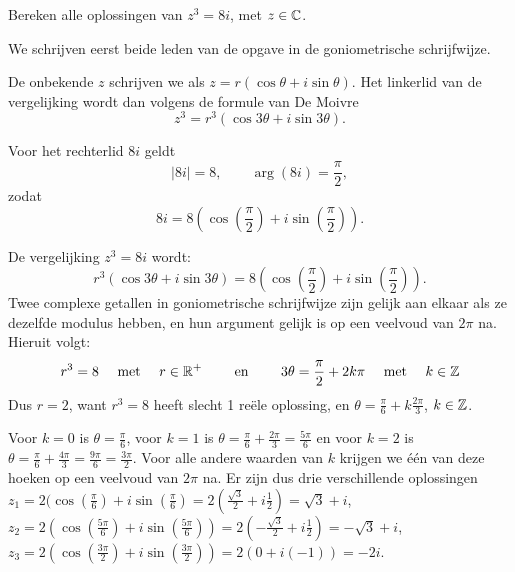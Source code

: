 \documentclass{ximera}
\begin{document}
\begin{basicSkip}
	\begin{exercise} Bereken alle oplossingen van $z^3=8i$, met $z\in \mathbb{C}$.
		\begin{oplossing}
			We schrijven eerst beide leden van de opgave in de goniometrische schrijfwijze.
			
			De onbekende $z$ schrijven we als $z = r(\cos\theta+i\sin\theta)$. Het linkerlid van de vergelijking wordt dan volgens de formule van De Moivre $$z^3 = r^3 (\cos 3\theta+i\sin 3\theta).$$
			
			Voor het rechterlid $8i$ geldt
			\[ |8i| = 8, \qquad \arg (8i) =  \frac{\pi}{2}, \]
			zodat
			\[ 8i = 8( \cos(\frac{\pi}{2}) + i \sin(\frac{\pi}{2})). \]
			
			De
			vergelijking $z^3=8i$ wordt:
			$$r^3 (\cos 3\theta+i\sin 3\theta) = 8( \cos(\frac{\pi}{2}) + i \sin(\frac{\pi}{2})).$$
			Twee complexe getallen in goniometrische schrijfwijze zijn gelijk aan elkaar als ze dezelfde modulus hebben, en hun argument gelijk is op een veelvoud van $2 \pi$ na.
			Hieruit volgt:
			\[ r^3 = 8 \quad \text{ met } \quad r\in \mathbb{R}^+ \qquad \text{ en } \qquad 3 \theta =  \frac{\pi}{2} + 2 k \pi \quad \text{ met } \quad k\in \mathbb{Z}\]
			Dus $r= 2$, want $r^3=8$ heeft slecht 1 reële oplossing, en $\theta =  \frac{\pi}{6} + k \frac{2\pi}{3}$, $k \in \mathbb{Z}$. 
			
			Voor $k=0$ is
			$\theta =  \frac{\pi}{6}$, voor $k=1$ is $\theta = 
			\frac{\pi}{6} + \frac{2\pi}{3} = \frac{5\pi}{6}$ en voor $k=2$ is $\theta = 
			\frac{\pi}{6} + \frac{4\pi}{3} = \frac{9\pi}{6} = \frac{3\pi}{2}$. Voor alle andere waarden van $k$ krijgen we één van deze hoeken op een veelvoud van $2 \pi$ na. Er zijn dus drie verschillende oplossingen 
			\\$ z_1 = 2( \cos(\frac{\pi}{6}) + i \sin(\frac{\pi}{6}) = 2(\frac{\sqrt3}{2} + i \frac12)= \sqrt 3 + i$,
			\\$	z_2 = 2( \cos(\frac{5\pi}{6}) + i \sin(\frac{5\pi}{6})) =2(- \frac{\sqrt3}{2} + i \frac12)=-\sqrt 3 +i $,
			\\$	z_3 = 2( \cos(\frac{3\pi}{2}) + i \sin(\frac{3\pi}{2})) =2(0 + i (-1))=-2i $.
		\end{oplossing}
		\end{exercise}
	\end{basicSkip}
\end{document}
